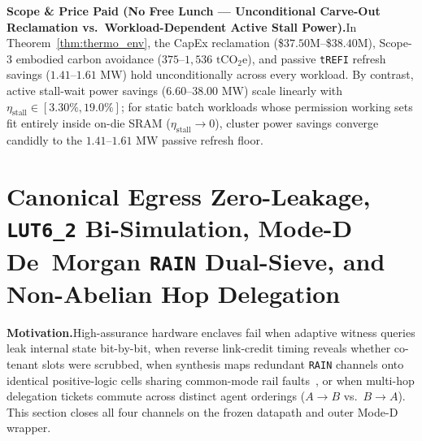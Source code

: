 \documentclass[11pt,letterpaper]{article}
\theoremstyle{spectralthm}
\begin{document}
\noindent\textbf{Scope \& Price Paid (No Free Lunch --- Unconditional Carve-Out Reclamation vs.\ Workload-Dependent Active Stall Power).}\;In Theorem~\ref{thm:thermo_env}, the CapEx reclamation (\$$37.50\text{M}$--\$$38.40\text{M}$), Scope-3 embodied carbon avoidance ($375$--$1,536\text{~tCO}_2\text{e}$), and passive \texttt{tREFI} refresh savings ($1.41$--$1.61\text{~MW}$) hold unconditionally across every workload. By contrast, active stall-wait power savings ($6.60$--$38.00\text{~MW}$) scale linearly with $\eta_{\mathrm{stall}} \in [3.30\%, 19.0\%]$; for static batch workloads whose permission working sets fit entirely inside on-die SRAM ($\eta_{\mathrm{stall}} \to 0$), cluster power savings converge candidly to the $1.41$--$1.61\text{~MW}$ passive refresh floor.

\section{Canonical Egress Zero-Leakage, \texorpdfstring{\texttt{LUT6\_2}}{LUT6\_2} Bi-Simulation, Mode-D De~Morgan \texorpdfstring{\texttt{RAIN}}{RAIN} Dual-Sieve, and Non-Abelian Hop Delegation}
\label{sec:formal}

\noindent\textbf{Motivation.}\;High-assurance hardware enclaves fail when adaptive witness queries leak internal state bit-by-bit, when reverse link-credit timing reveals whether co-tenant slots were scrubbed, when synthesis maps redundant \texttt{RAIN} channels onto identical positive-logic cells sharing common-mode rail faults~\cite{mitra2000commonmode}, or when multi-hop delegation tickets commute across distinct agent orderings ($A \to B$ vs.\ $B \to A$). This section closes all four channels on the frozen datapath and outer Mode-D wrapper.\par\smallskip
\end{document}
